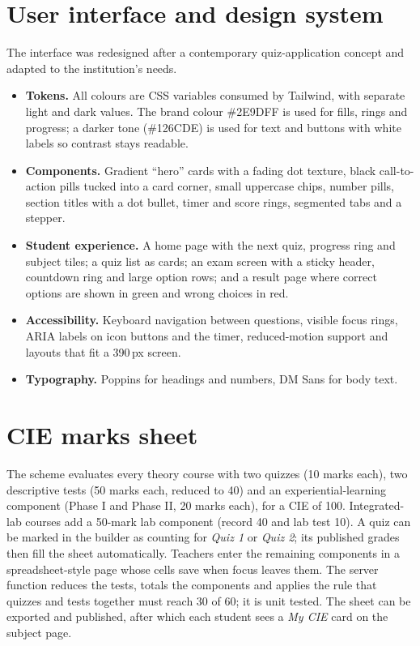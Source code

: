 \documentclass[12pt,a4paper,oneside]{report}
\newcommand{\code}[1]{\texttt{\detokenize{#1}}}
\begin{document}
\section{User interface and design system}
The interface was redesigned after a contemporary quiz-application concept and adapted to the institution's needs.
\begin{itemize}
  \item \textbf{Tokens.} All colours are CSS variables consumed by Tailwind, with separate light and dark values. The brand colour \#2E9DFF is used for fills, rings and progress; a darker tone (\#126CDE) is used for text and buttons with white labels so contrast stays readable.
  \item \textbf{Components.} Gradient ``hero'' cards with a fading dot texture, black call-to-action pills tucked into a card corner, small uppercase chips, number pills, section titles with a dot bullet, timer and score rings, segmented tabs and a stepper.
  \item \textbf{Student experience.} A home page with the next quiz, progress ring and subject tiles; a quiz list as cards; an exam screen with a sticky header, countdown ring and large option rows; and a result page where correct options are shown in green and wrong choices in red.
  \item \textbf{Accessibility.} Keyboard navigation between questions, visible focus rings, ARIA labels on icon buttons and the timer, reduced-motion support and layouts that fit a 390\,px screen.
  \item \textbf{Typography.} Poppins for headings and numbers, DM Sans for body text.
\end{itemize}

\section{CIE marks sheet}
The scheme evaluates every theory course with two quizzes (10 marks each), two descriptive tests (50 marks each, reduced to 40) and an experiential-learning component (Phase I and Phase II, 20 marks each), for a CIE of 100. Integrated-lab courses add a 50-mark lab component (record 40 and lab test 10). A quiz can be marked in the builder as counting for \emph{Quiz 1} or \emph{Quiz 2}; its published grades then fill the sheet automatically. Teachers enter the remaining components in a spreadsheet-style page whose cells save when focus leaves them. The server function \code{computeCie} reduces the tests, totals the components and applies the rule that quizzes and tests together must reach 30 of 60; it is unit tested. The sheet can be exported and published, after which each student sees a \emph{My CIE} card on the subject page.
\end{document}
